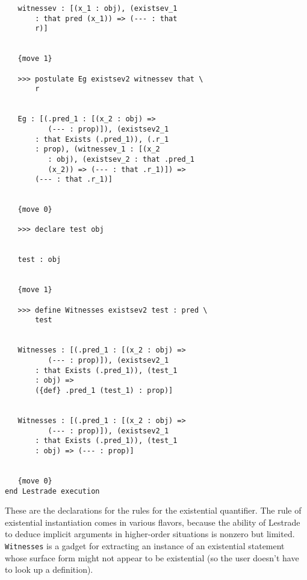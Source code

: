 \documentclass[12pt]{article}
\begin{document}
\begin{verbatim}
   witnessev : [(x_1 : obj), (existsev_1 
       : that pred (x_1)) => (--- : that 
       r)]


   {move 1}

   >>> postulate Eg existsev2 witnessev that \
       r


   Eg : [(.pred_1 : [(x_2 : obj) => 
          (--- : prop)]), (existsev2_1 
       : that Exists (.pred_1)), (.r_1 
       : prop), (witnessev_1 : [(x_2 
          : obj), (existsev_2 : that .pred_1 
          (x_2)) => (--- : that .r_1)]) => 
       (--- : that .r_1)]


   {move 0}

   >>> declare test obj


   test : obj


   {move 1}

   >>> define Witnesses existsev2 test : pred \
       test


   Witnesses : [(.pred_1 : [(x_2 : obj) => 
          (--- : prop)]), (existsev2_1 
       : that Exists (.pred_1)), (test_1 
       : obj) => 
       ({def} .pred_1 (test_1) : prop)]


   Witnesses : [(.pred_1 : [(x_2 : obj) => 
          (--- : prop)]), (existsev2_1 
       : that Exists (.pred_1)), (test_1 
       : obj) => (--- : prop)]


   {move 0}
end Lestrade execution
\end{verbatim}

These are the declarations for the rules for the existential quantifier.  The rule of existential instantiation comes in various flavors, because the ability of
Lestrade to deduce implicit arguments in higher-order situations is nonzero but limited.  {\tt Witnesses} is a gadget for extracting an instance of an existential statement whose
surface form might not appear to be existential (so the user doesn't have to look up a definition).
\end{document}
